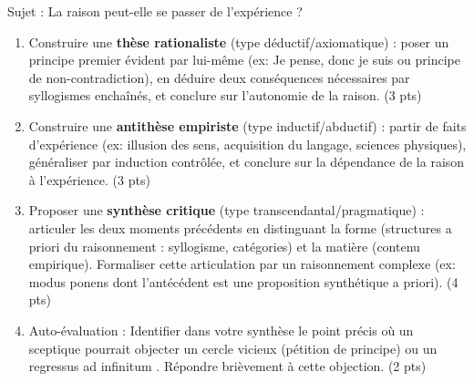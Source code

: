 \documentclass[11pt]{article}
\begin{document}
\begin{exercice}
Sujet : \og La raison peut-elle se passer de l'expérience ? \fg{}
\begin{enumerate}
    \item Construire une \textbf{thèse rationaliste} (type déductif/axiomatique) : poser un principe premier évident par lui-même (ex: \og Je pense, donc je suis \fg{} ou principe de non-contradiction), en déduire deux conséquences nécessaires par syllogismes enchaînés, et conclure sur l'autonomie de la raison. (3 pts)
    \item Construire une \textbf{antithèse empiriste} (type inductif/abductif) : partir de faits d'expérience (ex: illusion des sens, acquisition du langage, sciences physiques), généraliser par induction contrôlée, et conclure sur la dépendance de la raison à l'expérience. (3 pts)
    \item Proposer une \textbf{synthèse critique} (type transcendantal/pragmatique) : articuler les deux moments précédents en distinguant la \og forme \fg{} (structures a priori du raisonnement : syllogisme, catégories) et la \og matière \fg{} (contenu empirique). Formaliser cette articulation par un raisonnement complexe (ex: modus ponens dont l'antécédent est une proposition synthétique a priori). (4 pts)
    \item Auto-évaluation : Identifier dans votre synthèse le point précis où un sceptique pourrait objecter un \og cercle vicieux \fg{} (pétition de principe) ou un \og regressus ad infinitum \fg{}. Répondre brièvement à cette objection. (2 pts)
\end{enumerate}
\end{exercice}
\end{document}
